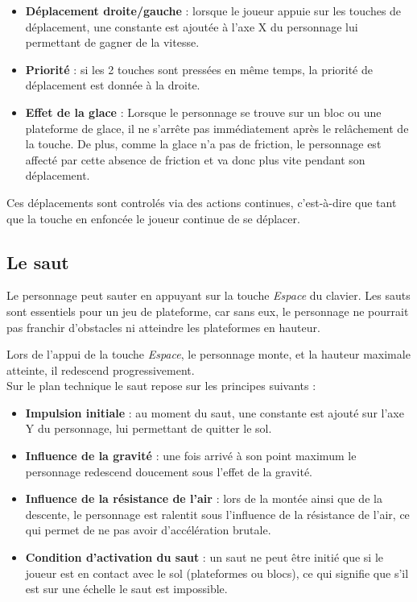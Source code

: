 \documentclass[10pt]{report}
\begin{document}
\begin{itemize}
  \item \textbf{Déplacement droite/gauche} : lorsque le joueur appuie sur les touches de déplacement, une constante est ajoutée à l'axe X du personnage lui permettant de gagner de la vitesse.
  \item \textbf{Priorité} : si les 2 touches sont pressées en même temps, la priorité de déplacement est donnée à la droite.
  \item \textbf{Effet de la glace} : Lorsque le personnage se trouve sur un bloc ou une plateforme de glace, il ne s'arrête pas immédiatement après le relâchement de la touche. De plus, comme la glace n'a pas de friction, le personnage est affecté par cette absence de friction et va donc plus vite pendant son déplacement.
\end{itemize}

Ces déplacements sont controlés via des actions continues, c'est-à-dire que tant que la touche en enfoncée le joueur continue de se déplacer. 


\subsection{Le saut}
Le personnage peut sauter en appuyant sur la touche \emph{Espace} du clavier. Les sauts sont essentiels pour un jeu de plateforme, car sans eux, le personnage ne pourrait pas franchir d'obstacles ni atteindre les plateformes en hauteur. 

Lors de l'appui de la touche \emph{Espace}, le personnage monte, et la hauteur maximale atteinte, il redescend progressivement. \\
Sur le plan technique le saut repose sur les principes suivants : 

\begin{itemize}
  \item \textbf{Impulsion initiale} : au moment du saut, une constante est ajouté sur l'axe Y du personnage, lui permettant de quitter le sol.
  \item \textbf{Influence de la gravité} : une fois arrivé à son point maximum le personnage redescend doucement sous l'effet de la gravité. 
  \item \textbf{Influence de la résistance de l'air} : lors de la montée ainsi que de la descente, le personnage est ralentit sous l'influence de la résistance de l'air, ce qui permet de ne pas avoir d'accélération brutale. 
  \item \textbf{Condition d'activation du saut} : un saut ne peut être initié que si le joueur est en contact avec le sol (plateformes ou blocs), ce qui signifie que s'il est sur une échelle le saut est impossible. 
\end{itemize}
\end{document}
